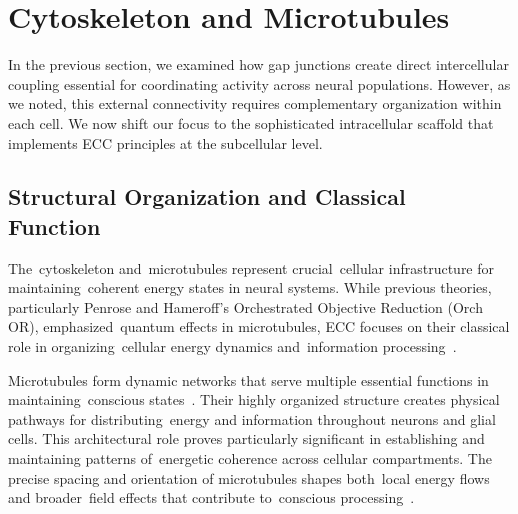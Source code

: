 \section{Cytoskeleton and Microtubules~~~}

In the previous section, we examined how gap junctions create direct intercellular coupling essential for coordinating activity across neural populations. However, as we noted, this external connectivity requires complementary organization within each cell. We now shift our focus to the sophisticated intracellular scaffold that implements ECC principles at the subcellular level.

\subsection*{Structural Organization and Classical Function~}

The~cytoskeleton and~microtubules represent crucial~cellular infrastructure for maintaining~coherent energy states in neural systems. While previous theories, particularly Penrose and Hameroff's Orchestrated Objective Reduction (Orch OR), emphasized~quantum effects in microtubules, ECC focuses on their classical role in organizing~cellular energy dynamics and~information processing~\cite{Fletcher2010, Hameroff2014}.

Microtubules form dynamic networks that serve multiple essential functions in maintaining~conscious states~\cite{Baas2011, Fletcher2010}. Their highly organized structure creates physical pathways for distributing~energy and information throughout neurons and glial cells. This architectural role proves particularly significant in establishing and maintaining patterns of~energetic coherence across cellular compartments. The precise spacing and orientation of microtubules shapes both~local energy flows and broader~field effects that contribute to~conscious processing~\cite{Conde2009, hunt2024electromagnetic}.

